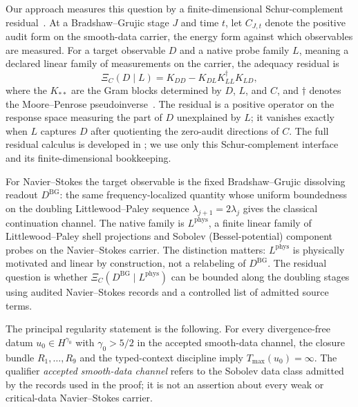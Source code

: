 \documentclass[11pt]{article}
\newcommand{\DBG}{D^{\mathrm{BG}}}
\newcommand{\Lphys}{L^{\mathrm{phys}}}
\newcommand{\Tmax}{T_{\max}}
\theoremstyle{definition}
\begin{document}
Our approach measures this question by a finite-dimensional
Schur-complement residual~\citep{Zhang2005SchurApplications}.  At a
Bradshaw--Grujic stage \(J\) and time \(t\), let \(C_{J,t}\) denote the
positive audit form on the smooth-data carrier, the energy form against
which observables are measured.  For a target observable \(D\) and a
native probe family \(L\), meaning a declared linear family of
measurements on the carrier, the adequacy residual is
\[
  \Xi_C(D\mid L)
  =
  K_{DD}-K_{DL}K_{LL}^{\dagger}K_{LD},
\]
where the \(K_{\ast\ast}\) are the Gram blocks determined by \(D\),
\(L\), and \(C\), and \(\dagger\) denotes the Moore--Penrose
pseudoinverse~\citep{Penrose1955GeneralizedInverse}.  The residual is a
positive operator on the response space measuring the part of \(D\)
unexplained by \(L\); it vanishes exactly when \(L\) captures \(D\)
after quotienting the zero-audit directions of \(C\).  The full
residual calculus is developed in \citet{Tsiokos2026XiCompanion}; we
use only this Schur-complement interface and its finite-dimensional
bookkeeping.

For Navier--Stokes the target observable is the fixed
Bradshaw--Grujic dissolving readout \(\DBG\): the same
frequency-localized quantity whose uniform boundedness on the doubling
Littlewood--Paley sequence \(\lambda_{j+1}=2\lambda_j\) gives the
classical continuation channel.  The native family is \(\Lphys\), a
finite linear family of Littlewood--Paley shell projections and Sobolev
(Bessel-potential) component probes on the Navier--Stokes carrier.  The
distinction matters: \(\Lphys\) is physically motivated and linear by
construction, not a relabeling of \(\DBG\).  The residual question is
whether \(\Xi_C(\DBG\mid\Lphys)\) can be bounded along the doubling
stages using audited Navier--Stokes records and a controlled list of
admitted source terms.

The principal regularity statement is the following.  For every
divergence-free datum \(u_0\in H^{\gamma_0}\) with \(\gamma_0>5/2\) in
the accepted smooth-data channel, the closure bundle
\(R_1,\ldots,R_9\) and the typed-context discipline imply
\(\Tmax(u_0)=\infty\).  The qualifier \emph{accepted smooth-data
channel} refers to the Sobolev data class admitted by the records used
in the proof; it is not an assertion about every weak or critical-data
Navier--Stokes carrier.
\end{document}
